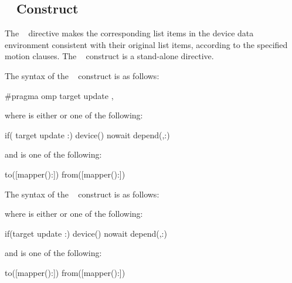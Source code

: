 \subsection{~ Construct}
\label{subsec:target update Construct}
\summary
The ~ directive makes the corresponding list items in 
the device data environment consistent with their original list items, according 
to the specified motion clauses. The ~ construct is a 
stand-alone directive.

\syntax
\begin{ccppspecific}
The syntax of the ~ construct is as follows:

\begin{ompcPragma}
#pragma omp target update \plc{clause[ [ [},\plc{] clause] ... ] new-line}
\end{ompcPragma}
where  is either  or one of the following:

\begin{indentedcodelist}
if(\plc{[} target update :\plc{] scalar-expression})
device()
nowait
depend(\plc{[depend-modifier},\plc{] dependence-type }:)
\end{indentedcodelist}

and  is one of the following:

\begin{indentedcodelist}
to([mapper():])
from([mapper():])
\end{indentedcodelist}
\end{ccppspecific}

\begin{fortranspecific}
The syntax of the ~ construct is as follows:


where  is either  or one of the following:

\begin{indentedcodelist}
if(\plc{[}target update :\plc{] scalar-logical-expression})
device()
nowait
depend(\plc{[depend-modifier},\plc{] dependence-type }:)
\end{indentedcodelist}

and  is one of the following:

\begin{indentedcodelist}
to([mapper():])
from([mapper():])
\end{indentedcodelist}
\end{fortranspecific}

